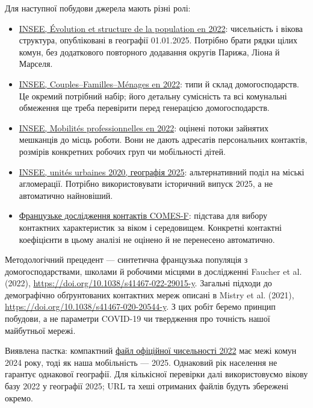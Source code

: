 \documentclass[11pt,a4paper]{article}
\begin{document}
Для наступної побудови джерела мають різні ролі:
\begin{itemize}
\item \href{https://www.insee.fr/fr/statistiques/8581696}{INSEE, Évolution et structure de la population en 2022}: чисельність і вікова структура, опубліковані в географії 01.01.2025. Потрібно брати рядки цілих комун, без додаткового повторного додавання округів Парижа, Ліона й Марселя.
\item \href{https://www.insee.fr/fr/statistiques/8647008}{INSEE, Couples--Familles--Ménages en 2022}: типи й склад домогосподарств. Це окремий потрібний набір; його детальну сумісність та всі комунальні обмеження ще треба перевірити перед генерацією домогосподарств.
\item \href{https://www.insee.fr/fr/statistiques/8582949}{INSEE, Mobilités professionnelles en 2022}: оцінені потоки зайнятих мешканців до місць роботи. Вони не дають адресатів персональних контактів, розмірів конкретних робочих груп чи мобільності дітей.
\item \href{https://www.insee.fr/fr/information/4802589}{INSEE, unités urbaines 2020, географія 2025}: альтернативний поділ на міські агломерації. Потрібно використовувати історичний випуск 2025, а не автоматично найновіший.
\item \href{https://journals.plos.org/plosone/article?id=10.1371/journal.pone.0133203}{Французьке дослідження контактів COMES-F}: підстава для вибору контактних характеристик за віком і середовищем. Конкретні контактні коефіцієнти в цьому аналізі не оцінено й не перенесено автоматично.
\end{itemize}

Методологічний прецедент --- синтетична французька популяція з домогосподарствами, школами й робочими місцями в дослідженні Faucher et al. (2022), \url{https://doi.org/10.1038/s41467-022-29015-y}. Загальні підходи до демографічно обґрунтованих контактних мереж описані в Mistry et al. (2021), \url{https://doi.org/10.1038/s41467-020-20544-y}. З цих робіт беремо принцип побудови, а не параметри COVID-19 чи твердження про точність нашої майбутньої мережі.

Виявлена пастка: компактний \href{https://www.insee.fr/fr/statistiques/8290591}{файл офіційної чисельності 2022} має межі комун 2024 року, тоді як наша мобільність --- 2025. Однаковий рік населення не гарантує однакової географії. Для кількісної перевірки далі використовуємо вікову базу 2022 у географії 2025; URL та хеші отриманих файлів будуть збережені окремо.
\end{document}
